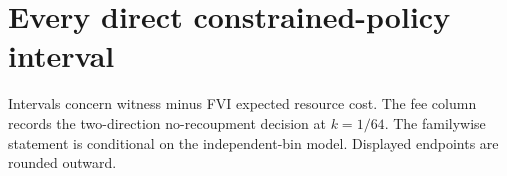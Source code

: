 \section{Every direct constrained-policy interval}\label{supp:direct-table48}
Intervals concern witness minus FVI expected resource cost. The fee column records the two-direction no-recoupment decision at $k=1/64$. The familywise statement is conditional on the independent-bin model. Displayed endpoints are rounded outward.




